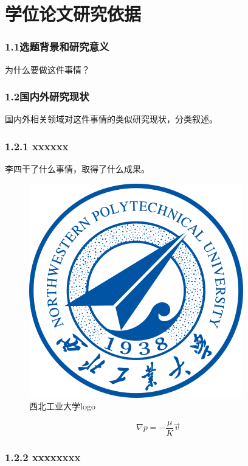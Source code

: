 \documentclass[12pt]{article}
\begin{document}
\section{学位论文研究依据}


\subsubsection*{1.1选题背景和研究意义}

为什么要做这件事情？

\subsubsection*{1.2国内外研究现状}

国内外相关领域对这件事情的类似研究现状，分类叙述。

\subsubsection*{1.2.1 xxxxxx}

李四\cite{zhang2022}干了什么事情，取得了什么成果。

\begin{figure}[htb]
	\centering
	\includegraphics[width=0.4\linewidth]{nwpu-logo.png}
	\caption{西北工业大学logo}
	\label{fig-0101}
\end{figure}

\begin{equation*}
	\nabla p = -\frac{\mu}{K} \vec{v} 
\end{equation*}

\subsubsection*{1.2.2 xxxxxxxx}
\end{document}
